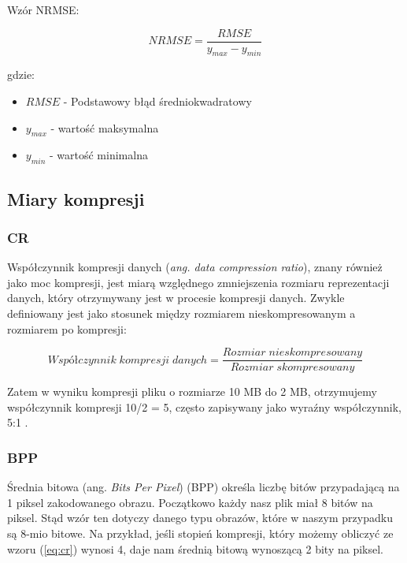 \documentclass{article}
\begin{document}
Wzór NRMSE:

\begin{equation}
  NRMSE = \frac{RMSE}{y_{max} - y_{min}}
\end{equation}

gdzie:
\begin{itemize}[label=]
  \item $RMSE$ - Podstawowy błąd średniokwadratowy
  \item $y_{max}$ - wartość maksymalna
  \item $y_{min}$ - wartość minimalna
\end{itemize}

\subsection{Miary kompresji}

\subsubsection{CR}

Współczynnik kompresji danych (\textit{ang. data compression ratio}), znany również jako moc kompresji, jest miarą względnego zmniejszenia rozmiaru reprezentacji danych, który otrzymywany jest w procesie kompresji danych. Zwykle definiowany jest jako stosunek między rozmiarem nieskompresowanym a rozmiarem po kompresji:

\begin{equation}
  Współczynnik\;kompresji\;danych = \frac{Rozmiar\;nieskompresowany}{Rozmiar\;skompresowany}
  \label{eq:cr}
\end{equation}

Zatem w wyniku kompresji pliku o rozmiarze 10 MB do 2 MB, otrzymujemy współczynnik kompresji 10/2 = 5, często zapisywany jako wyraźny współczynnik, 5:1 \cite{compression_ratio}.

\subsubsection{BPP}

Średnia bitowa (ang. \emph{Bits Per Pixel}) (BPP) określa liczbę bitów przypadającą na 1 piksel zakodowanego obrazu. Początkowo każdy nasz plik miał 8 bitów na piksel. Stąd wzór ten dotyczy danego typu obrazów, które w naszym przypadku są 8-mio bitowe. Na przykład, jeśli stopień kompresji, który możemy obliczyć ze wzoru (\ref{eq:cr}) wynosi 4, daje nam średnią bitową wynoszącą 2 bity na piksel.
\end{document}
